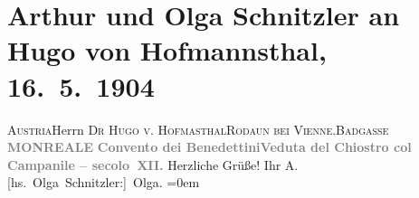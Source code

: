 

         
         \renewcommand{\erwaehntePersonen}{Personen: Hugo von Hofmannsthal, Olga Schnitzler}
         \renewcommand{\erwaehnteOrte}{Orte: Badgasse, Castellaccio di Monreale, Monreale, Palermo, Rodaun, Österreich}
         \renewcommand{\erwaehnteWerke}{}
               \section[Arthur und Olga Schnitzler an Hugo von Hofmannsthal, 16. 5. 1904]{ Arthur und Olga Schnitzler an Hugo von Hofmannsthal,
               16. 5. 1904}\nopagebreak{}\rehead{ }\begin{ledgroupsized}[t]{13cm}\normalsize\beginnumbering \toendnotes[C]{\smallbreak\pagebreak[2]} 
\pstart{}{\pb}\textsc{Austria}\pend{}\pstart{}Herrn \textsc{Dr Hugo v. Hofma{\geminationn}sthal}\pend{}\pstart{}\textsc{Rodaun bei Vienne.}\pend{}\pstart{}\textsc{Badgasse}\pend{}{\bigskip}\pstart
           \noindent{}\centering{}\textcolor{gray}{\textbf{{\pb}MONREALE}}\pend
           \pstart
           \noindent{}\centering{}\textcolor{gray}{\textbf{Convento dei Benedettini\hspace*{1em}Veduta del Chiostro col Campanile –
                     secolo XII.}}\pend
           \pstart
           Herzliche Grüße!\pend
           \pstart
           Ihr \spacefill\mbox{A.}{\\[\baselineskip]}\spacefill\mbox{{[}hs. Olga Schnitzler:{]} Olga.}\pend
           \leftskip=0em{}
         
         \endnumbering{}\end{ledgroupsized}  \newcommand{\dateiname}{L01401}\newcommand{\titel}{Arthur und Olga Schnitzler an Hugo von Hofmannsthal, 16. 5. 1904}\newcommand{\editorInnen}{Martin Anton Müller und Gerd-Hermann Susen}
      